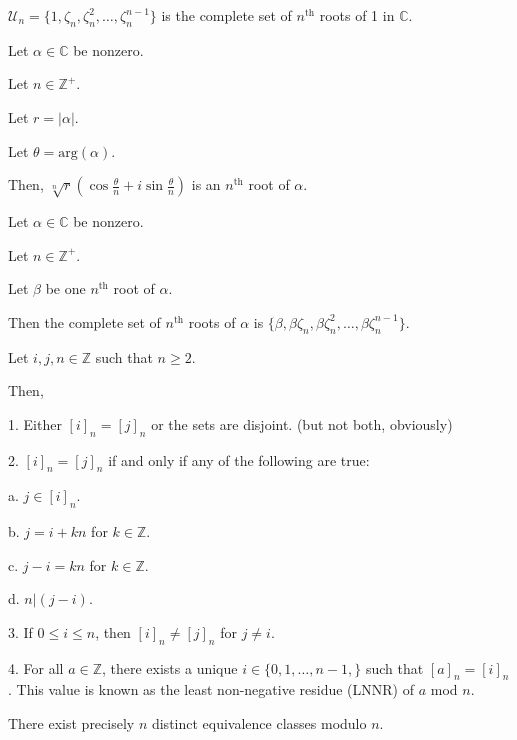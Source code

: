 \documentclass{article}
\newcommand{\Z}{\mathbb Z}
\newcommand{\C}{\mathbb C}
\begin{document}

    $\mathcal{U}_n = \{1, \zeta_n, \zeta_n^2, \hdots, \zeta_n^{n-1}\}$ is the complete set of $n^{\text{th}}$ roots of 1 in $\C$.


    Let $\alpha \in \C$ be nonzero.
    
    Let $n \in \Z^+$.
    
    Let $r = |\alpha|$.
    
    Let $\theta = \text{arg}(\alpha)$.
    
    Then, $\sqrt[n]{r}(\cos{\frac{\theta}{n}} + i\sin{\frac{\theta}{n}})$ is an $n^{\text{th}}$ root of $\alpha$.
    
    
    Let $\alpha \in \C$ be nonzero.
    
    Let $n \in \Z^+$.
    
    Let $\beta$ be one $n^{\text{th}}$ root of $\alpha$.
    
    Then the complete set of $n^{\text{th}}$ roots of $\alpha$ is $\{\beta, \beta\zeta_n,\beta\zeta_n^2, \hdots, \beta\zeta_n^{n-1}\}$.
    
\newpage
    
    
    Let $i,j,n \in \Z$ such that $n \geq 2$.
    
    Then,
    
    1. Either $[i]_n = [j]_n$ or the sets are disjoint. (but not both, obviously)
    
    2. $[i]_n = [j]_n$ if and only if any of the following are true:
    
    \indent\indent a. $j\in[i]_n$.
    
    \indent\indent b. $j=i+kn$ for $k \in\Z$.
    
    \indent\indent c. $j - i = kn$ for $k \in\Z$.
    
    \indent\indent d. $n|(j - i)$.
    
    3. If $0 \leq i \leq n$, then $[i]_n \neq [j]_n$ for $j \neq i$.
    
    4. For all $a \in\Z$, there exists a unique $i \in \{0, 1, \hdots, n-1,\}$ such that $[a]_n = [i]_n$. This value is known as the least non-negative residue (LNNR) of $a$ mod $n$.
    

    There exist precisely $n$ distinct equivalence classes modulo $n$.
    
\end{document}
